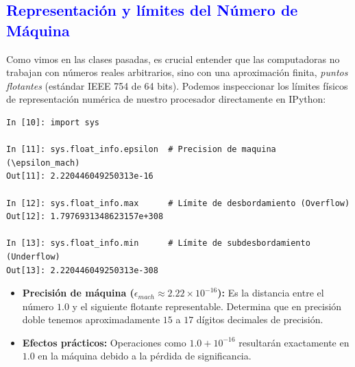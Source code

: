 \documentclass[12pt]{article}
\begin{document}
\subsection*{\textcolor{blue}{Representación y límites del Número de Máquina}}

Como vimos en las clases pasadas, es crucial entender que las computadoras no trabajan con 
números reales arbitrarios, sino con una aproximación finita, \textit{puntos flotantes} 
(estándar IEEE 754 de 64 bits). 
Podemos inspeccionar los límites físicos de representación numérica de nuestro procesador 
directamente en IPython:

\begin{lstlisting}
In [10]: import sys

In [11]: sys.float_info.epsilon  # Precision de maquina (\epsilon_mach)
Out[11]: 2.220446049250313e-16

In [12]: sys.float_info.max      # Límite de desbordamiento (Overflow)
Out[12]: 1.7976931348623157e+308

In [13]: sys.float_info.min      # Límite de subdesbordamiento (Underflow)
Out[13]: 2.220446049250313e-308
\end{lstlisting}

\begin{itemize}
    \item \textbf{Precisión de máquina ($\epsilon_{mach} \approx 2.22 \times 10^{-16}$):} 
    Es la distancia entre el número $1.0$ y el siguiente flotante representable. Determina que en precisión doble tenemos aproximadamente $15$ a $17$ dígitos decimales de precisión.
    \item \textbf{Efectos prácticos:} Operaciones como $1.0 + 10^{-16}$ 
    resultarán exactamente en $1.0$ en la máquina debido a la pérdida de significancia.
\end{itemize}
\end{document}
